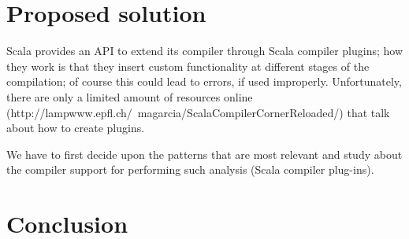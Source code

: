 \documentclass{article}
\begin{document}
\section{Proposed solution}

Scala provides an API to extend its compiler through Scala compiler plugins; how they work is that they insert custom functionality at different stages of the compilation; of course this could lead to errors, if used improperly. Unfortunately, there are only a limited amount of resources online (http://lampwww.epfl.ch/~magarcia/ScalaCompilerCornerReloaded/) that talk about how to create plugins. \par
We have to first decide upon the patterns that are most relevant and study about the compiler support for performing such analysis (Scala compiler plug-ins). 

\section{Conclusion}


\newpage


 

\end{document}
